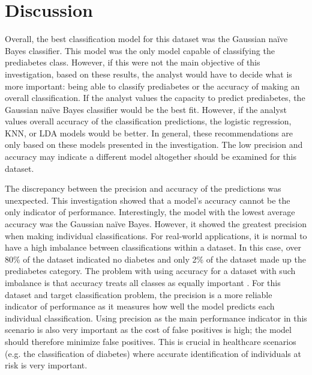 \documentclass[journal]{IEEEtran}
\begin{document}
\pagebreak

\section{Discussion}
\label{sec:discussion}

Overall, the best classification model for this dataset was the Gaussian naïve Bayes classifier. This model was the only model capable of classifying the prediabetes class. However, if this were not the main objective of this investigation, based on these results, the analyst would have to decide what is more important: being able to classify prediabetes or the accuracy of making an overall classification. If the analyst values the capacity to predict prediabetes, the Gaussian naïve Bayes classifier would be the best fit. However, if the analyst values overall accuracy of the classification predictions, the logistic regression, KNN, or LDA models would be better. In general, these recommendations are only based on these models presented in the investigation. The low precision and accuracy may indicate a different model altogether should be examined for this dataset. 

The discrepancy between the precision and accuracy of the predictions was unexpected. This investigation showed that a model's accuracy cannot be the only indicator of performance. Interestingly, the model with the lowest average accuracy was the Gaussian naïve Bayes. However, it showed the greatest precision when making individual classifications. For real-world applications, it is normal to have a high imbalance between classifications within a dataset. In this case, over 80\% of the dataset indicated no diabetes and only 2\% of the dataset made up the prediabetes category. The problem with using accuracy for a dataset with such imbalance is that accuracy treats all classes as equally important \cite{b13}. For this dataset and target classification problem, the precision is a more reliable indicator of performance as it measures how well the model predicts each individual classification. Using precision as the main performance indicator in this scenario is also very important as the cost of false positives is high; the model should therefore minimize false positives. This is crucial in healthcare scenarios (e.g. the classification of diabetes) where accurate identification of individuals at risk is very important.
\end{document}
